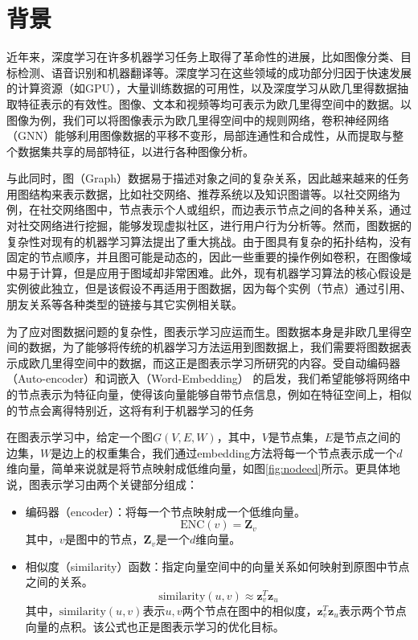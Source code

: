 \section{背景}\label{Intro}
近年来，深度学习在许多机器学习任务上取得了革命性的进展，比如图像分类\cite{deng2009imagenet}、目标检测\cite{redmon2016you}、语音识别\cite{hinton2012deep}和机器翻译\cite{luong2015effective}等。深度学习在这些领域的成功部分归因于快速发展的计算资源（如GPU），大量训练数据的可用性，以及深度学习从欧几里得数据抽取特征表示的有效性。图像、文本和视频等均可表示为欧几里得空间中的数据。以图像为例，我们可以将图像表示为欧几里得空间中的规则网络，卷积神经网络（GNN）\cite{NIPS2012_4824}能够利用图像数据的平移不变形，局部连通性和合成性，从而提取与整个数据集共享的局部特征，以进行各种图像分析。

与此同时，图（Graph）数据易于描述对象之间的复杂关系，因此越来越来的任务用图结构来表示数据，比如社交网络、推荐系统以及知识图谱等。以社交网络为例，在社交网络图中，节点表示个人或组织，而边表示节点之间的各种关系，通过对社交网络进行挖掘，能够发现虚拟社区，进行用户行为分析等。然而，图数据的复杂性对现有的机器学习算法提出了重大挑战。由于图具有复杂的拓扑结构，没有固定的节点顺序，并且图可能是动态的，因此一些重要的操作例如卷积，在图像域中易于计算，但是应用于图域却非常困难。此外，现有机器学习算法的核心假设是实例彼此独立，但是该假设不再适用于图数据，因为每个实例（节点）通过引用、朋友关系等各种类型的链接与其它实例相关联。

为了应对图数据问题的复杂性，图表示学习应运而生。图数据本身是非欧几里得空间的数据，为了能够将传统的机器学习方法运用到图数据上，我们需要将图数据表示成欧几里得空间中的数据，而这正是图表示学习所研究的内容。受自动编码器（Auto-encoder）\cite{hinton2006reducing}和词嵌入（Word-Embedding）\cite{mikolov2013distributed} 的启发，我们希望能够将网络中的节点表示为特征向量，使得该向量能够自带节点信息，例如在特征空间上，相似的节点会离得特别近，这将有利于机器学习的任务

在图表示学习中，给定一个图$G(V, E, W)$，其中，$V$是节点集，$E$是节点之间的边集，$W$是边上的权重集合，我们通过embedding方法将每一个节点表示成一个$d$维向量，简单来说就是将节点映射成低维向量，如图\ref{fig:nodeed}所示。更具体地说，图表示学习由两个关键部分组成：
\begin{itemize}
  \item 编码器（encoder）：将每一个节点映射成一个低维向量。
	\[\text{ENC}(v) = \textbf{Z}_v\]
	其中，$v$是图中的节点，$\textbf{Z}_v$是一个$d$维向量。
	\item 相似度（similarity）函数：指定向量空间中的向量关系如何映射到原图中节点之间的关系。
	  \[\text{similarity}(u, v) \approx \textbf{z}_v^T\textbf{z}_u\]
	  其中，$\text{similarity}(u, v)$表示$u, v$两个节点在图中的相似度，$\textbf{z}_v^T \textbf{z}_u$表示两个节点向量的点积。该公式也正是图表示学习的优化目标。
\end{itemize}

